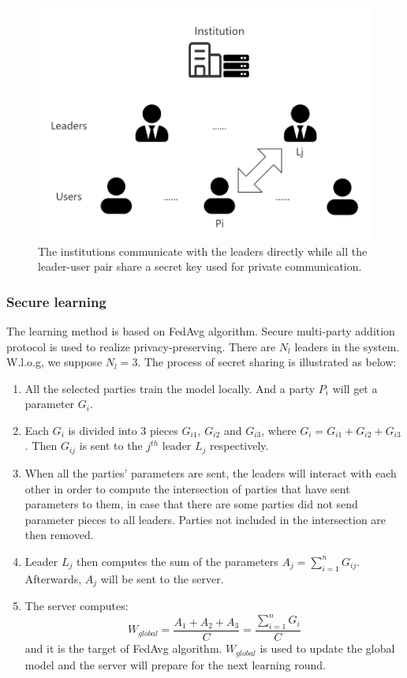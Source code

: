\begin{figure}[!ht]
    \centering
    \includegraphics[width=\columnwidth]{img/leader-user.png}
    \caption{The institutions communicate with the leaders directly while all the leader-user pair share a secret key used for private communication.}
    \label{leader-user}
\end{figure}

\subsubsection{\textbf{Secure learning}}
The learning method is based on FedAvg algorithm\cite{mcmahan2016communicationefficient}. Secure multi-party addition protocol is used to realize privacy-preserving. There are $N_l$ leaders in the system. W.l.o.g, we suppose $N_l = 3$. The process of secret sharing is illustrated as below:

\begin{enumerate}
    \item All the selected parties train the model locally. And a party $P_i$ will get a parameter $G_i$.
    
    \item Each $G_i$ is divided into 3 pieces $G_{i1}$, $G_{i2}$ and $G_{i3}$, where $G_i = G_{i1} + G_{i2} + G_{i3}$. Then $G_{ij}$ is sent to the $j^{th}$ leader $L_j$ respectively.
    
    \item When all the parties' parameters are sent, the leaders will interact with each other in order to compute the intersection of parties that have sent parameters to them, in case that there are some parties did not send parameter pieces to all leaders. Parties not included in the intersection are then removed. 

    \item Leader $L_j$ then computes the sum of the parameters $A_j = \sum_{i=1}^nG_{ij}$. Afterwards, $A_j$ will be sent to the server.

    \item The server computes: 
    $$W_{global} = \frac{A_1 + A_2 + A_3}{C}  = \frac{\sum_{i=1}^nG_i}{C} $$ 
    and it is the target of FedAvg algorithm. $W_{global}$ is used to update the global model and the server will prepare for the next learning round.
\end{enumerate}

